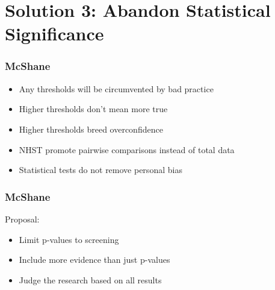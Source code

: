 \documentclass[10pt, compress]{beamer}
\begin{document}
\section{Solution 3: Abandon Statistical Significance}
\begin{frame}[fragile]
  \frametitle{McShane}
  \begin{itemize}
  \item Any thresholds will be circumvented by bad practice
  \item Higher thresholds don't mean more true
  \item Higher thresholds breed overconfidence
  \item NHST promote pairwise comparisons instead of total data
  \item Statistical tests do not remove personal bias
  \end{itemize}
\end{frame}

\begin{frame}[fragile]
  \frametitle{McShane}
  Proposal:
  \begin{itemize}
  \item Limit p-values to screening
  \item Include more evidence than just p-values
  \item Judge the research based on all results
  \end{itemize}
\end{frame}
\end{document}

